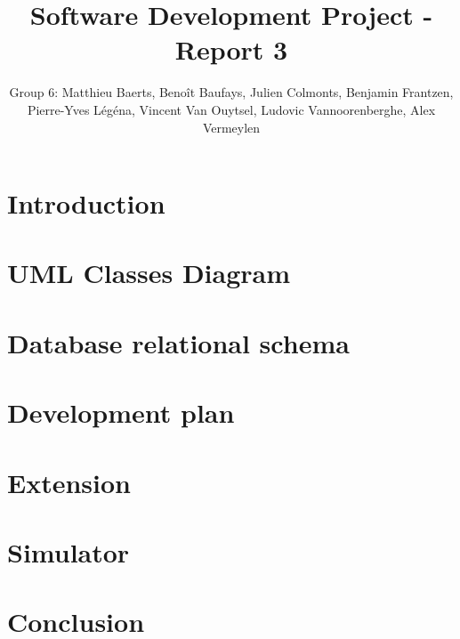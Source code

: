 \documentclass[11pt,a4paper]{article}
\title{Software Development Project - Report 3}
\author{Group 6: Matthieu Baerts, Benoît Baufays, Julien Colmonts, Benjamin Frantzen, Pierre-Yves Légéna, Vincent Van Ouytsel, Ludovic Vannoorenberghe, Alex Vermeylen}
\begin{document}



\tableofcontents
\thispagestyle{empty}	%
\newpage
{} %

\section*{Introduction}


\section{UML Classes Diagram}


\section{Database relational schema}


\section{Development plan}


\section{Extension}


\section{Simulator}


\section*{Conclusion}



\newpage

\appendix
{}

\end{document}
